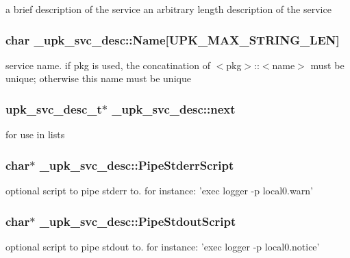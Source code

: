a brief description of the service an arbitrary length description of the service 
\subsubsection{\setlength{\rightskip}{0pt plus 5cm}char \bf{\_\-upk\_\-svc\_\-desc::Name}[UPK\_\-MAX\_\-STRING\_\-LEN]\hspace{0.3cm}{\tt  [inherited]}}\label{group__config__impl_g077f1c6e434fb12180adc090679680e6}


service name. if pkg is used, the concatination of $<$pkg$>$::$<$name$>$ must be unique; otherwise this name must be unique 
\subsubsection{\setlength{\rightskip}{0pt plus 5cm}\bf{upk\_\-svc\_\-desc\_\-t}$\ast$ \bf{\_\-upk\_\-svc\_\-desc::next}\hspace{0.3cm}{\tt  [inherited]}}\label{group__config__impl_gb7b260816622a389b792b182d5104d02}


for use in lists 
\subsubsection{\setlength{\rightskip}{0pt plus 5cm}char$\ast$ \bf{\_\-upk\_\-svc\_\-desc::Pipe\-Stderr\-Script}\hspace{0.3cm}{\tt  [inherited]}}\label{group__config__impl_gaa84441ba54d622077a08dfa39b209c4}


optional script to pipe stderr to. for instance: 'exec logger -p local0.warn' 
\subsubsection{\setlength{\rightskip}{0pt plus 5cm}char$\ast$ \bf{\_\-upk\_\-svc\_\-desc::Pipe\-Stdout\-Script}\hspace{0.3cm}{\tt  [inherited]}}\label{group__config__impl_g9f7047b28ae7d790af32211b684e22d3}


optional script to pipe stdout to. for instance: 'exec logger -p local0.notice' 

